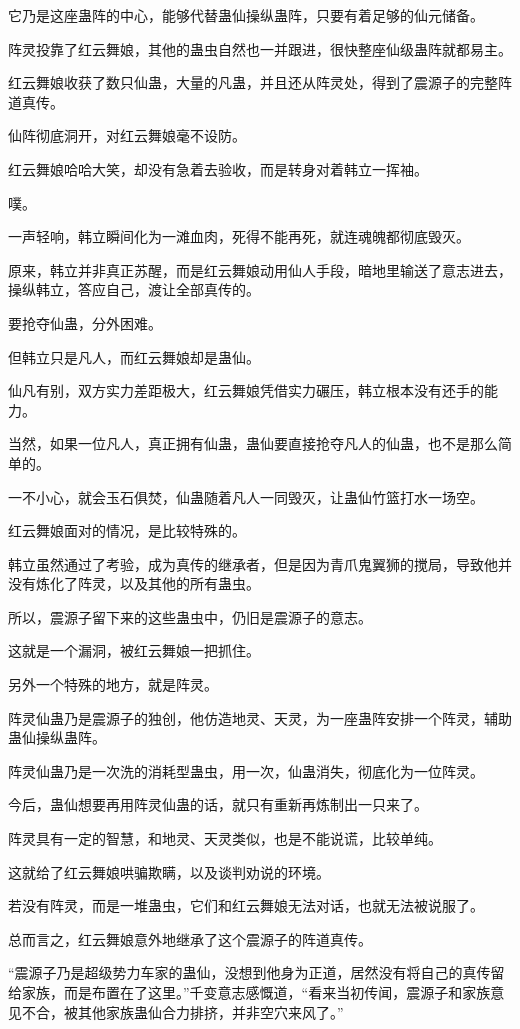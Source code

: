 \begin{this_body}
它乃是这座蛊阵的中心，能够代替蛊仙操纵蛊阵，只要有着足够的仙元储备。

阵灵投靠了红云舞娘，其他的蛊虫自然也一并跟进，很快整座仙级蛊阵就都易主。

红云舞娘收获了数只仙蛊，大量的凡蛊，并且还从阵灵处，得到了震源子的完整阵道真传。

仙阵彻底洞开，对红云舞娘毫不设防。

红云舞娘哈哈大笑，却没有急着去验收，而是转身对着韩立一挥袖。

噗。

一声轻响，韩立瞬间化为一滩血肉，死得不能再死，就连魂魄都彻底毁灭。

原来，韩立并非真正苏醒，而是红云舞娘动用仙人手段，暗地里输送了意志进去，操纵韩立，答应自己，渡让全部真传的。

要抢夺仙蛊，分外困难。

但韩立只是凡人，而红云舞娘却是蛊仙。

仙凡有别，双方实力差距极大，红云舞娘凭借实力碾压，韩立根本没有还手的能力。

当然，如果一位凡人，真正拥有仙蛊，蛊仙要直接抢夺凡人的仙蛊，也不是那么简单的。

一不小心，就会玉石俱焚，仙蛊随着凡人一同毁灭，让蛊仙竹篮打水一场空。

红云舞娘面对的情况，是比较特殊的。

韩立虽然通过了考验，成为真传的继承者，但是因为青爪鬼翼狮的搅局，导致他并没有炼化了阵灵，以及其他的所有蛊虫。

所以，震源子留下来的这些蛊虫中，仍旧是震源子的意志。

这就是一个漏洞，被红云舞娘一把抓住。

另外一个特殊的地方，就是阵灵。

阵灵仙蛊乃是震源子的独创，他仿造地灵、天灵，为一座蛊阵安排一个阵灵，辅助蛊仙操纵蛊阵。

阵灵仙蛊乃是一次洗的消耗型蛊虫，用一次，仙蛊消失，彻底化为一位阵灵。

今后，蛊仙想要再用阵灵仙蛊的话，就只有重新再炼制出一只来了。

阵灵具有一定的智慧，和地灵、天灵类似，也是不能说谎，比较单纯。

这就给了红云舞娘哄骗欺瞒，以及谈判劝说的环境。

若没有阵灵，而是一堆蛊虫，它们和红云舞娘无法对话，也就无法被说服了。

总而言之，红云舞娘意外地继承了这个震源子的阵道真传。

“震源子乃是超级势力车家的蛊仙，没想到他身为正道，居然没有将自己的真传留给家族，而是布置在了这里。”千变意志感慨道，“看来当初传闻，震源子和家族意见不合，被其他家族蛊仙合力排挤，并非空穴来风了。”


\end{this_body}
